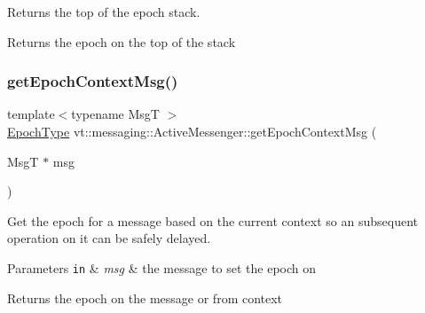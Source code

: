 Returns the top of the epoch stack. 

\begin{DoxyReturn}{Returns}
the epoch on the top of the stack 
\end{DoxyReturn}
\mbox{\label{structvt_1_1messaging_1_1_active_messenger_aa60710a2d4a1ac7fe60113fd8cbb9809}} 
\subsubsection{\texorpdfstring{get\+Epoch\+Context\+Msg()}{getEpochContextMsg()}\hspace{0.1cm}{\footnotesize\ttfamily [1/2]}}
{\footnotesize\ttfamily template$<$typename MsgT $>$ \\
\hyperlink{namespacevt_a985a5adf291c34a3ca263b3378388236}{Epoch\+Type} vt\+::messaging\+::\+Active\+Messenger\+::get\+Epoch\+Context\+Msg (\begin{DoxyParamCaption}\item[{MsgT $\ast$}]{msg }\end{DoxyParamCaption})\hspace{0.3cm}{\ttfamily [inline]}}



Get the epoch for a message based on the current context so an subsequent operation on it can be safely delayed. 


\begin{DoxyParams}[1]{Parameters}
\mbox{\tt in}  & {\em msg} & the message to set the epoch on\\
\hline
\end{DoxyParams}
\begin{DoxyReturn}{Returns}
the epoch on the message or from context 
\end{DoxyReturn}
\mbox{\label{structvt_1_1messaging_1_1_active_messenger_a66c64223357aa92f45a4a4042bd63a5f}} 
